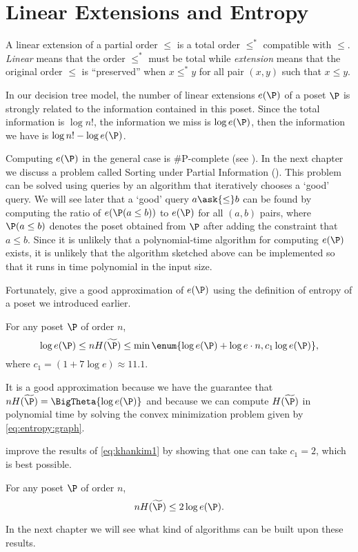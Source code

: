 \section{Linear Extensions and Entropy}

A linear extension of a partial order $\leq$ is a total order $\leq^*$
compatible with $\leq$. \emph{Linear} means that the order $\leq^*$ must be
total while \emph{extension} means that the original order $\leq$ is
``preserved'' \ie when \(x \leq^* y\) for all pair \((x,y)\) such that \(x
\leq y\).

In our decision tree model, the number of linear extensions $e(\P)$ of a poset
$\P$ is strongly related to the information contained in this poset. Since the
total information is $\log n!$, the information we miss is $\log e(\P)$, then
the information we have is $\log n! - \log e(\P)$.

Computing $e(\P)$ in the general case is \#P-complete
(see \citet*{brightwell1991counting}). In the next chapter we discuss a
problem called Sorting under Partial Information (\SUPI). This problem can be solved using \BigO{\ITLB}
queries by an algorithm that
iteratively chooses a `good' query. We will see later that a `good' query \(a \ask{\le} b\) can be
found by computing the ratio of \(e(\P(a \le b))\) to \(e(\P)\) for all \((a,b)\) pairs, where
\(\P(a \le b)\) denotes the poset obtained
from \(\P\) after adding the constraint that \(a \le b\).
Since it is unlikely that
a polynomial-time algorithm for computing \(e(\P)\) exists, it is unlikely that
the algorithm sketched above
can be implemented so that it runs in time polynomial in the input size.

Fortunately, \citet*{kahn:1995} give a good
approximation of $e(\P)$ using the definition of entropy of a poset we
introduced earlier.
\begin{theorem}
\label{eq:khankim1}
For any poset \(\P\) of order \(n\),
\begin{displaymath}
\log e(\P) \le n H(\widetilde{\P}) \le \min\enum{\log e(\P) + \log e \cdot n, c_1
\log e(\P)},
\end{displaymath}
where \(c_1 = (1 + 7 \log e) \approx 11.1\).
\end{theorem}

It is a good approximation because we have the guarantee that
\(n H(\widetilde{\P}) = \BigTheta{\log e(\P)}\) and because we can compute
\(H(\widetilde{\P})\) in polynomial time by solving the convex minimization
problem given by \ref{eq:entropy:graph}.

\citet*{cardinal:2013} improve the results of \ref{eq:khankim1} by showing that
one can take \(c_1 = 2\), which is best possible.
\begin{theorem}
For any poset \(\P\) of order \(n\),
\begin{displaymath}
n H(\widetilde{\P}) \le 2 \log e(\P).
\end{displaymath}
\end{theorem}

In the next chapter we will see what kind of algorithms can be built upon
these results.
